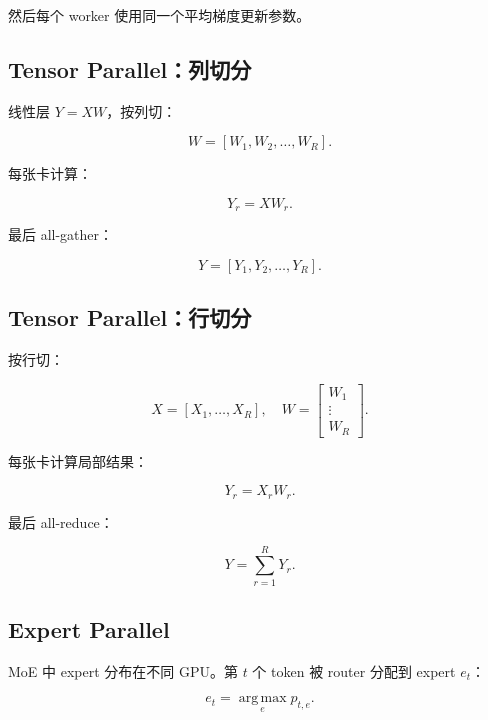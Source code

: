 \documentclass[UTF8,12pt]{ctexart}
\newcommand{\1}{\mathbf{1}}
\newcommand{\argmax}{\operatorname*{arg\,max}}
\begin{document}
然后每个 worker 使用同一个平均梯度更新参数。

\subsection{Tensor Parallel：列切分}

线性层 $Y=XW$，按列切：

\begin{equation}
W=[W_1,W_2,\dots,W_R].
\end{equation}

每张卡计算：

\begin{equation}
Y_r=XW_r.
\end{equation}

最后 all-gather：

\begin{equation}
Y=[Y_1,Y_2,\dots,Y_R].
\end{equation}

\subsection{Tensor Parallel：行切分}

按行切：

\begin{equation}
X=[X_1,\dots,X_R],
\quad
W=
\begin{bmatrix}
W_1\\
\vdots\\
W_R
\end{bmatrix}.
\end{equation}

每张卡计算局部结果：

\begin{equation}
Y_r=X_rW_r.
\end{equation}

最后 all-reduce：

\begin{equation}
Y=\sum_{r=1}^{R}Y_r.
\end{equation}

\subsection{Expert Parallel}

MoE 中 expert 分布在不同 GPU。第 $t$ 个 token 被 router 分配到 expert $e_t$：

\begin{equation}
e_t=\argmax_e p_{t,e}.
\end{equation}
\end{document}
